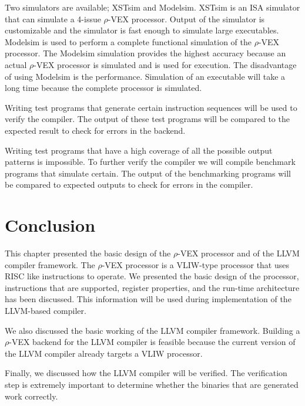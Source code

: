 Two simulators are available; XSTsim and Modelsim. XSTsim is an ISA simulator that can simulate a 4-issue $\rho$-VEX processor. Output of the simulator is customizable and the simulator is fast enough to simulate large executables. Modelsim is used to perform a complete functional simulation of the $\rho$-VEX processor. The Modelsim simulation provides the highest accuracy because an actual $\rho$-VEX processor is simulated and is used for execution. The disadvantage of using Modelsim is the performance. Simulation of an executable will take a long time because the complete processor is simulated.

Writing test programs that generate certain instruction sequences will be used to verify the compiler. The output of these test programs will be compared to the expected result to check for errors in the backend.

Writing test programs that have a high coverage of all the possible output patterns is impossible. To further verify the compiler we will compile benchmark programs that simulate certain. The output of the benchmarking programs will be compared to expected outputs to check for errors in the compiler.

\section{Conclusion}
This chapter presented the basic design of the $\rho$-VEX processor and of the LLVM compiler framework. The $\rho$-VEX processor is a VLIW-type processor that uses RISC like instructions to operate. We presented the basic design of the processor, instructions that are supported, register properties, and the run-time architecture has been discussed. This information will be used during implementation of the LLVM-based compiler.

We also discussed the basic working of the LLVM compiler framework. Building a $\rho$-VEX backend for the LLVM compiler is feasible because the current version of the LLVM compiler already targets a VLIW processor. 

Finally, we discussed how the LLVM compiler will be verified. The verification step is extremely important to determine whether the binaries that are generated work correctly.

\acresetall


